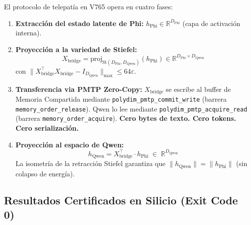 El protocolo de telepatía en V765 opera en cuatro fases:

\begin{enumerate}
  \item \textbf{Extracción del estado latente de Phi:}
        $h_{\text{Phi}} \in \mathbb{R}^{D_{\text{Phi}}}$ (capa de activación interna).

  \item \textbf{Proyección a la variedad de Stiefel:}
        \begin{equation}
          X_{\text{bridge}} = \mathrm{proj}_{\mathrm{St}(D_{\text{Phi}}, D_{\text{Qwen}})}(h_{\text{Phi}})
          \in \mathbb{R}^{D_{\text{Phi}} \times D_{\text{Qwen}}}
        \end{equation}
        con $\|X_{\text{bridge}}^\top X_{\text{bridge}} - I_{D_{\text{Qwen}}}\|_{\max} \le 64\varepsilon$.

  \item \textbf{Transferencia via PMTP Zero-Copy:}
        $X_{\text{bridge}}$ se escribe al buffer de Memoria Compartida mediante
        \texttt{polydim\_pmtp\_commit\_write} (barrera \texttt{memory\_order\_release}).
        Qwen lo lee mediante \texttt{polydim\_pmtp\_acquire\_read}
        (barrera \texttt{memory\_order\_acquire}).
        \textbf{Cero bytes de texto. Cero tokens. Cero serialización.}

  \item \textbf{Proyección al espacio de Qwen:}
        \begin{equation}
          h_{\text{Qwen}} = X_{\text{bridge}}^\top \cdot h_{\text{Phi}}
          \;\in\; \mathbb{R}^{D_{\text{Qwen}}}
        \end{equation}
        La isometría de la retracción Stiefel garantiza que $\|h_{\text{Qwen}}\| = \|h_{\text{Phi}}\|$
        (sin colapso de energía).
\end{enumerate}

\subsection{Resultados Certificados en Silicio (Exit Code 0)}


\centering


